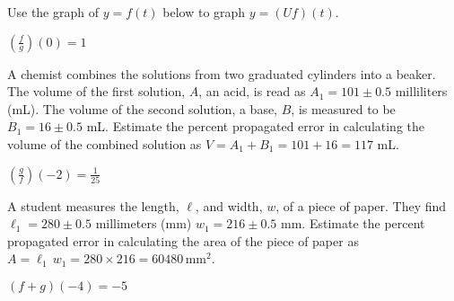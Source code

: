 \documentclass{ximera}
\begin{document}
\begin{question}
Use the graph of $y=f(t)$ below to graph $y=(Uf)(t)$.

\begin{center}

% 


\end{center}
\begin{solution}
$\left(\frac{f}{g}\right)(0) = 1$
\end{solution}

\end{question}

\begin{question}
A chemist combines the solutions from two graduated cylinders into a beaker.  The volume of the first solution, $A$, an acid,  is read as $A_{1} = 101 \pm 0.5$ milliliters (mL). The volume of the second solution,  a base, $B$,  is measured to be $B_{1} = 16 \pm 0.5$ mL.    Estimate the percent propagated error in calculating the volume of the combined solution as $V = A_{1} + B_{1} = 101 + 16 = 117$ mL.
\begin{solution}
$\left(\frac{g}{f}\right)\left(-2\right) = \frac{1}{25}$

\end{solution}

\end{question}

\begin{question}
A student measures the length, $\ell$, and width, $w$,  of a piece of paper.  They find  $\ell_{1} = 280 \pm 0.5$ millimeters (mm) $w_{1} = 216 \pm 0.5$ mm.    Estimate the percent propagated error in calculating the area of the piece of paper as $A = \ell_{1} \, w_{1} = 280 \times 216 = 60480 \, \text{mm}^2$.
\begin{solution}
$(f + g)(-4) = -5$
\end{solution}

\end{question}
\end{document}

